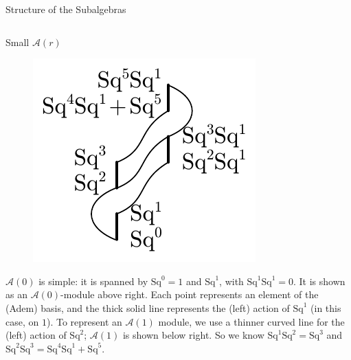 \documentclass[final]{beamer}
\newcommand{\A}{\mathcal{A}}
\newcommand{\Sq}{\mathrm{Sq}}
\begin{document}
\begin{columns}[T]
\begin{column}{0.495\textwidth}
\begin{section}{Structure of the Subalgebras}
\begin{columns}[T]
\begin{column}{0.66\textwidth}
\begin{block}{Small $\A(r)$}
\begin{figure}
\begin{center}
                  \hspace{-0.7in}\includegraphics[scale=2]{pics/A1.pdf}
                  \vspace{0.2em}
                \end{center}
              \end{figure}
              $\A(0)$ is simple: it is spanned by $\Sq^0=1$ and $\Sq^1$, with $\Sq^1\Sq^1=0$.  It is shown as an $\A(0)$-module above right.  Each point represents an element of the (Adem) basis, and the thick solid line represents the (left) action of $\Sq^1$ (in this case, on $1$).  To represent an $\A(1)$ module, we use a thinner curved line for the (left) action of $\Sq^2$; $\A(1)$ is shown below right. So we know $\Sq^1\Sq^2=\Sq^3$ and $\Sq^2\Sq^3=\Sq^4\Sq^1+\Sq^5$.
            \end{block}
            \begin{figure}
              \begin{center}
                \vspace{-1em}

\end{center}
\end{figure}
\end{column}
\end{columns}
\end{section}
\end{column}
\end{columns}
\end{document}
